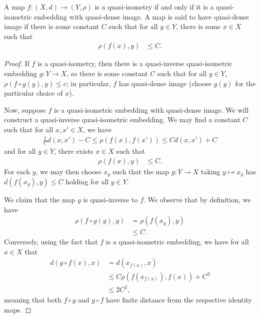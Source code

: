\documentclass[10pt]{mypackage}
\begin{document}
\begin{proposition}
  A map $f\colon (X,d)\rightarrow (Y,\rho)$ is a quasi-isometry if and only if it is a quasi-isometric embedding with quasi-dense image. A map is said to have quasi-dense image if there is some constant $C$ such that for all $y\in Y$, there is some $x\in X$ such that
  \begin{align*}
    \rho\left( f(x),y \right) &\leq C.
  \end{align*}
\end{proposition}
\begin{proof}
  If $f$ is a quasi-isometry, then there is a quasi-inverse quasi-isometric embedding $g\colon Y\rightarrow X$, so there is some constant $C$ such that for all $y\in Y$, $\rho\left( f\circ g(y),y \right) \leq c$; in particular, $f$ has quasi-dense image (choose $g(y)$ for the particular choice of $x$).

  Now, suppose $f$ is a quasi-isometric embedding with quasi-dense image. We will construct a quasi-inverse quasi-isometric embedding. We may find a constant $C$ such that for all $x,x'\in X$, we have
  \begin{align*}
    \frac{1}{C}d\left( x,x' \right)-C \leq \rho\left( f(x),f(x') \right)\leq Cd(x,x') + C
  \end{align*}
  and for all $y\in Y$, there exists $x\in X$ such that
  \begin{align*}
    \rho\left( f(x),y \right) &\leq C.
  \end{align*}
  For each $y$, we may then choose $x_y$ such that the map $g\colon Y\rightarrow X$ taking $y\mapsto x_y$ has $d\left( f\left( x_y \right),y \right)\leq C$ holding for all $y\in Y$.

  We claim that the map $g$ is quasi-inverse to $f$. We observe that by definition, we have
  \begin{align*}
    \rho\left( f\circ g(y),y \right) &= \rho\left( f\left( x_y \right),y \right)\\
                                     &\leq C.
  \end{align*}
  Conversely, using the fact that $f$ is a quasi-isometric embedding, we have for all $x\in X$ that
  \begin{align*}
    d\left( g\circ f(x),x \right) &= d\left( x_{f(x)},x \right)\\
                                  &\leq C\rho\left( f\left( x_{f(x)} \right),f(x) \right) + C^2\\
                                  &\leq 2C^2,
  \end{align*}
  meaning that both $f\circ g$ and $g\circ f$ have finite distance from the respective identity maps.


\end{proof}
\end{document}
